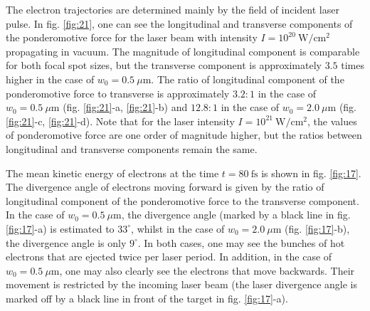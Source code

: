 The electron trajectories are determined mainly by the field of incident laser pulse. In fig. \ref{fig:21}, one can see the longitudinal and transverse components of the ponderomotive force for the laser beam with intensity $ I = 10^{20} \ \mathrm{W/cm^2} $ propagating in vacuum. The magnitude of longitudinal component is comparable for both focal spot sizes, but the transverse component is approximately $ 3.5 $ times higher in the case of $ w_0 = 0.5 \ \mu\mathrm{m} $. The ratio of longitudinal component of the ponderomotive force to transverse is approximately $ 3.2:1 $ in the case of $ w_0 = 0.5 \ \mu\mathrm{m} $ (fig. \ref{fig:21}-a, \ref{fig:21}-b) and $ 12.8:1 $ in the case of $ w_0 = 2.0 \ \mu\mathrm{m} $ (fig. \ref{fig:21}-c, \ref{fig:21}-d). Note that for the laser intensity $ I = 10^{21} \ \mathrm{W/cm^2} $, the values of ponderomotive force are one order of magnitude higher, but the ratios between longitudinal and transverse components remain the same.

The mean kinetic energy of electrons at the time $ t = 80 \ \mathrm{fs} $ is shown in fig. \ref{fig:17}. The divergence angle of electrons moving forward is given by the ratio of longitudinal component of the ponderomotive force to the transverse component. In the case of $ w_0 = 0.5 \ \mu\mathrm{m} $, the divergence angle (marked by a black line in fig. \ref{fig:17}-a) is estimated to $ 33^{\circ} $, whilst in the case of $ w_0 = 2.0 \ \mu\mathrm{m} $ (fig. \ref{fig:17}-b), the divergence angle is only $ 9^{\circ} $. In both cases, one may see the bunches of hot electrons that are ejected twice per laser period. In addition, in the case of $ w_0 = 0.5 \ \mu\mathrm{m} $, one may also clearly see the electrons that move backwards. Their movement is restricted by the incoming laser beam (the laser divergence angle is marked off by a black line in front of the target in fig. \ref{fig:17}-a).

